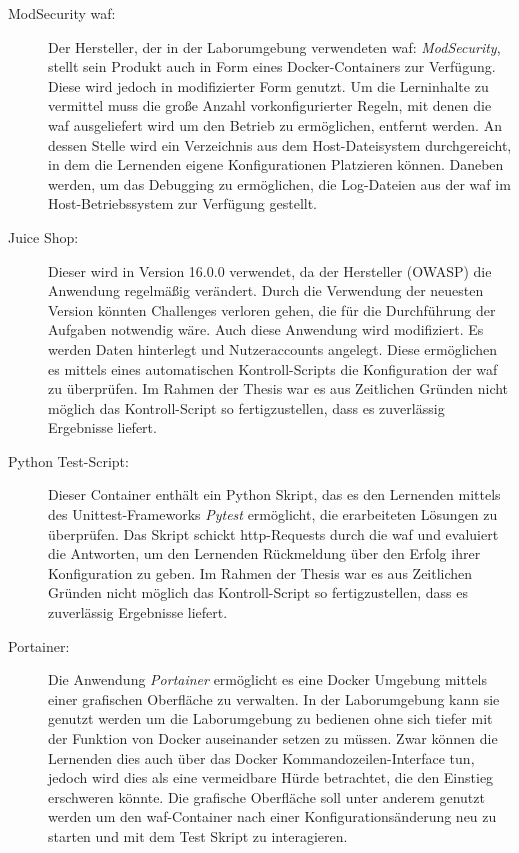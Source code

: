 \begin{description}
    \item[ModSecurity \ac{waf}:] Der Hersteller, der in der Laborumgebung verwendeten \ac{waf}: \textit{ModSecurity}, stellt sein Produkt auch in Form eines Docker-Containers zur Verfügung. 
    Diese wird jedoch in modifizierter Form genutzt.
    Um die Lerninhalte zu vermittel muss die große Anzahl vorkonfigurierter Regeln, mit denen die \ac{waf} ausgeliefert wird um den Betrieb zu ermöglichen, entfernt werden.
    An dessen Stelle wird ein Verzeichnis aus dem Host-Dateisystem durchgereicht, in dem die Lernenden eigene Konfigurationen Platzieren können.
    Daneben werden, um das Debugging zu ermöglichen, die Log-Dateien aus der \ac{waf} im Host-Betriebssystem zur Verfügung gestellt.
    
    \item[Juice Shop:] Dieser wird in Version 16.0.0 verwendet, da der Hersteller (OWASP) die Anwendung regelmäßig verändert.
    Durch die Verwendung der neuesten Version könnten Challenges verloren gehen, die für die Durchführung der Aufgaben notwendig wäre.
    Auch diese Anwendung wird modifiziert.
    Es werden Daten hinterlegt und Nutzeraccounts angelegt.
    Diese ermöglichen es mittels eines automatischen Kontroll-Scripts die Konfiguration der \ac{waf} zu überprüfen.
    Im Rahmen der Thesis war es aus Zeitlichen Gründen nicht möglich das Kontroll-Script so fertigzustellen, dass es zuverlässig Ergebnisse liefert.

    \item[Python Test-Script:] Dieser Container enthält ein Python Skript, das es den Lernenden mittels des Unittest-Frameworks \textit{Pytest} ermöglicht, die erarbeiteten Lösungen zu überprüfen.
    Das Skript schickt \ac{http}-Requests durch die \ac{waf} und evaluiert die Antworten, um den Lernenden Rückmeldung über den Erfolg ihrer Konfiguration zu geben.
    Im Rahmen der Thesis war es aus Zeitlichen Gründen nicht möglich das Kontroll-Script so fertigzustellen, dass es zuverlässig Ergebnisse liefert.

    \item[Portainer:] Die Anwendung \textit{Portainer} ermöglicht es eine Docker Umgebung mittels einer grafischen Oberfläche zu verwalten.
    In der Laborumgebung kann sie genutzt werden um die Laborumgebung zu bedienen ohne sich tiefer mit der Funktion von Docker auseinander setzen zu müssen.
    Zwar können die Lernenden dies auch über das Docker Kommandozeilen-Interface tun, jedoch wird dies als eine vermeidbare Hürde betrachtet, die den Einstieg erschweren könnte.
    Die grafische Oberfläche soll unter anderem genutzt werden um den \ac{waf}-Container nach einer Konfigurationsänderung neu zu starten und mit dem Test Skript zu interagieren. 
\end{description}

